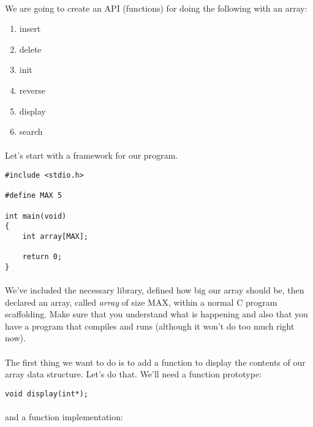 \documentclass[10pt, a4paper, twosize]{article}
\begin{document}
\paragraph{} We are going to create an API (functions) for doing the following with an array:

\begin{enumerate}
\item insert
\item delete
\item init
\item reverse
\item display
\item search
\end{enumerate}

\paragraph{} Let's start with a framework for our program.

\begin{lstlisting}
#include <stdio.h>

#define MAX 5

int main(void)
{
    int array[MAX];

    return 0;
}
\end{lstlisting}
\paragraph{} We've included the necessary library, defined how big our array should be, then declared an array, called \emph{array} of size MAX, within a normal C program scaffolding. Make sure that you understand what is happening and also that you have a program that compiles and runs (although it won't do too much right now).

\paragraph{} The first thing we want to do is to add a function to display the contents of our array data structure. Let's do that. We'll need a function prototype:

\begin{lstlisting}
void display(int*);
\end{lstlisting}

\paragraph{} and a function implementation:
\end{document}
